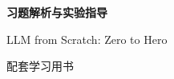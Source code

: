 \begin{titlepage}
\centering\vspace*{36mm}
{\Huge\bfseries 习题解析与实验指导\par}
\vspace{16mm}
{\Large LLM from Scratch: Zero to Hero\par}
\vfill
{\Large\bookauthor\par}
\vspace{12mm}
{\large 配套学习用书\par}
\vspace{6mm}
{\normalsize\textsf{\bookedition}\par}
\end{titlepage}

